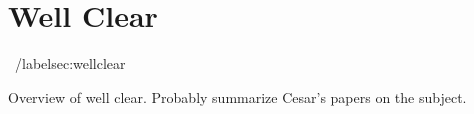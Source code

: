 \section{Well Clear}~/label{sec:wellclear}  

Overview of well clear. Probably summarize Cesar's papers on the subject.

